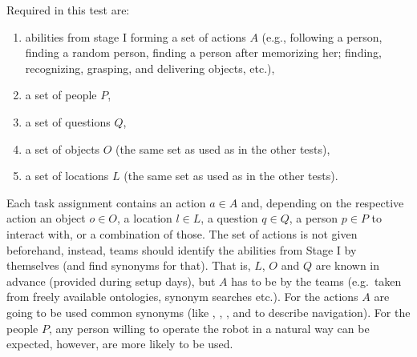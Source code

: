 Required in this test are:
\begin{enumerate}
	\item abilities from stage I forming a set of actions $A$ (e.g., following a person, finding a random person, finding a person after memorizing her; finding, recognizing, grasping, and delivering objects, etc.),
	\item a set of people $P$,
	\item a set of questions $Q$,
	\item a set of objects $O$ (the same set as used as in the other tests),
	\item a set of locations $L$ (the same set as used as in the other tests).
\end{enumerate}

Each task assignment contains an action $a \in A$ and, depending on the respective action an object $o \in O$, a location $l \in L$, a question $q \in Q$, a person $p \in P$ to interact with, or a combination of those. The set of actions is not given beforehand, instead, teams should identify the abilities from Stage I by themselves (and find synonyms for that). That is, $L$, $O$ and $Q$ are known in advance (provided during setup days), but $A$ has to be  by the teams (e.g.~taken from freely available ontologies, synonym searches etc.). For the actions $A$ are going to be used common synonyms (like , , , and  to describe navigation). For the people $P$, any person willing to operate the robot in a natural way can be expected, however,  are more likely to be used.

